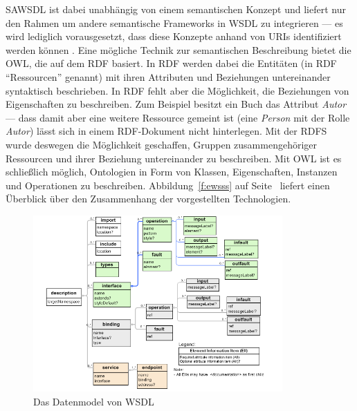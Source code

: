 \ac{SAWSDL} ist dabei unabhängig von einem semantischen Konzept und liefert nur den Rahmen um andere semantische Frameworks in \ac{WSDL} zu integrieren --- es wird lediglich vorausgesetzt, dass diese Konzepte anhand von URIs identifiziert werden können \cite[S.61]{ky-sawsdl}. Eine mögliche Technik zur semantischen Beschreibung bietet die \ac{OWL}, die auf dem \ac{RDF} basiert. In \ac{RDF} werden dabei die Entitäten (in \ac{RDF} "`Ressourcen"' genannt) mit ihren Attributen und Beziehungen untereinander syntaktisch beschrieben. In \ac{RDF} fehlt aber die Möglichkeit, die Beziehungen von Eigenschaften zu beschreiben. Zum Beispiel besitzt ein Buch das Attribut \emph{Autor} --- dass damit aber eine weitere Ressource gemeint ist (eine \emph{Person} mit der Rolle \emph{Autor}) lässt sich in einem \ac{RDF}-Dokument nicht hinterlegen. Mit der \ac{RDFS} wurde deswegen die Möglichkeit geschaffen, Gruppen zusammengehöriger Ressourcen und ihrer Beziehung untereinander zu beschreiben. Mit \ac{OWL} ist es schließlich möglich, Ontologien in Form von Klassen, Eigenschaften, Instanzen und Operationen zu beschreiben. Abbildung~\ref{f:ewsss} auf Seite~\pageref{f:ewsss} liefert einen Überblick über den Zusammenhang der vorgestellten Technologien.

\begin{figure}[ht]
\centering
\parbox{0.85\textwidth}{
    \includegraphics[width=0.85\textwidth]{media/WSDL20InfosetModel.png}
    \caption{Das Datenmodel von \ac{WSDL}}
    \label{f:wsdlmodel}
}
\end{figure}

